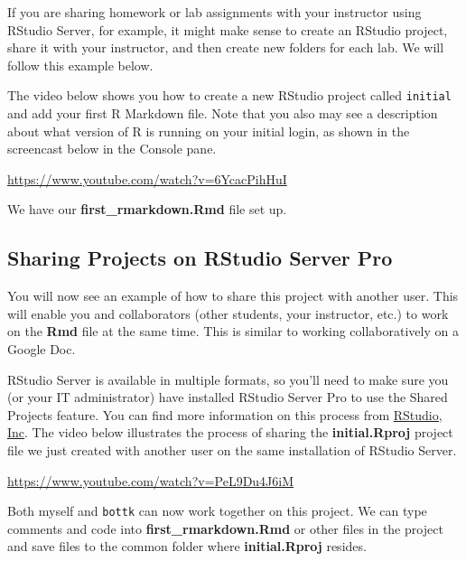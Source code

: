 \documentclass[]{tufte-book}
\begin{document}
If you are sharing homework or lab assignments with your instructor using RStudio Server, for example, it might make sense to create an RStudio project, share it with your instructor, and then create new folders for each lab. We will follow this example below.

The video below shows you how to create a new RStudio project called \texttt{initial} and add your first R Markdown file. Note that you also may see a description about what version of R is running on your initial login, as shown in the screencast below in the Console pane.

\vspace{0.1in}\begin{center}\footnotesize{\url{https://www.youtube.com/watch?v=6YcacPihHuI}}\end{center}\vspace{0.1in}

We have our \textbf{first\_rmarkdown.Rmd} file set up.

\hypertarget{sharing-projects-on-rstudio-server-pro}{%
\subsection{Sharing Projects on RStudio Server Pro}\label{sharing-projects-on-rstudio-server-pro}}

You will now see an example of how to share this project with another user. This will enable you and collaborators (other students, your instructor, etc.) to work on the \textbf{Rmd} file at the same time. This is similar to working collaboratively on a Google Doc.

RStudio Server is available in multiple formats, so you'll need to make sure you (or your IT administrator) have installed RStudio Server Pro to use the Shared Projects feature. You can find more information on this process from \href{https://support.rstudio.com/hc/en-us/articles/211659737-Sharing-Projects-in-RStudio-Server-Pro}{RStudio, Inc}. The video below illustrates the process of sharing the \textbf{initial.Rproj} project file we just created with another user on the same installation of RStudio Server.

\vspace{0.1in}\begin{center}\footnotesize{\url{https://www.youtube.com/watch?v=PeL9Du4J6iM}}\end{center}\vspace{0.1in}

Both myself and \texttt{bottk} can now work together on this project. We can type comments and code into \textbf{first\_rmarkdown.Rmd} or other files in the project and save files to the common folder where \textbf{initial.Rproj} resides.
\end{document}

